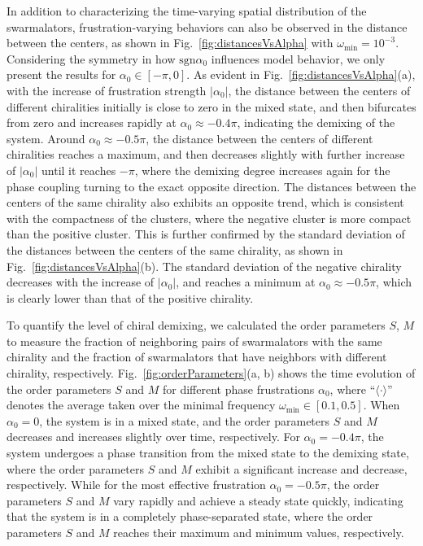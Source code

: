 \documentclass{article}
\begin{document}
In addition to characterizing the time-varying spatial distribution of the swarmalators, frustration-varying behaviors can also be observed in the distance between the centers, as shown in Fig.~\ref{fig:distancesVsAlpha} with $\omega_{\min}=10^{-3}$. Considering the symmetry in how $\text{sgn}\alpha_0$ influences model behavior, we only present the results for $\alpha_0\in\left[ -\pi, 0 \right]$. 
As evident in Fig.~\ref{fig:distancesVsAlpha}(a), with the increase of frustration strength $\left|\alpha_0\right|$, the distance between the centers of different chiralities initially is close to zero in the mixed state, and then bifurcates from zero and increases rapidly at $\alpha_0\approx -0.4\pi$, indicating the demixing of the system. Around $\alpha_0\approx -0.5\pi$, the distance between the centers of different chiralities reaches a maximum, and then decreases slightly with further increase of $\left|\alpha_0\right|$ until it reaches $-\pi$, where the demixing degree increases again for the phase coupling turning to the exact opposite direction. 
The distances between the centers of the same chirality also exhibits an opposite trend, which is consistent with the compactness of the clusters, where the negative cluster is more compact than the positive cluster. This is further confirmed by the standard deviation of the distances between the centers of the same chirality, as shown in Fig.~\ref{fig:distancesVsAlpha}(b). The standard deviation of the negative chirality decreases with the increase of $\left|\alpha_0\right|$, and reaches a minimum at $\alpha_0\approx -0.5\pi$, which is clearly lower than that of the positive chirality.

To quantify the level of chiral demixing, we calculated the order parameters $S$, $M$ to measure the fraction of neighboring pairs of swarmalators with the same chirality and the fraction of swarmalators that have neighbors with different chirality, respectively. Fig.~\ref{fig:orderParameters}(a, b) shows the time evolution of the order parameters $S$ and $M$ for different phase frustrations $\alpha_0$, where \enquote{$\langle\cdot\rangle$} denotes the average taken over the minimal frequency $\omega_{\min}\in\left[0.1, 0.5\right]$. 
When $\alpha_0=0$, the system is in a mixed state, and the order parameters $S$ and $M$ decreases and increases slightly over time, respectively. 
For $\alpha_0=-0.4\pi$, the system undergoes a phase transition from the mixed state to the demixing state, where the order parameters $S$ and $M$ exhibit a significant increase and decrease, respectively.
While for the most effective frustration $\alpha_0=-0.5\pi$, the order parameters $S$ and $M$ vary rapidly and achieve a steady state quickly, indicating that the system is in a completely phase-separated state, where the order parameters $S$ and $M$ reaches their maximum and minimum values, respectively.
\end{document}
